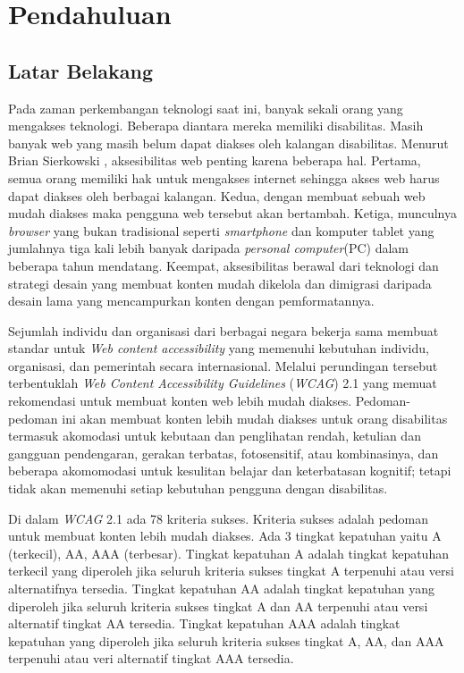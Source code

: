 \chapter{Pendahuluan}
\label{chap:intro}
   
\section{Latar Belakang}
\label{sec:label}
Pada zaman perkembangan teknologi saat ini, banyak sekali orang yang mengakses teknologi. Beberapa diantara mereka memiliki disabilitas. Masih banyak web yang masih belum dapat diakses oleh kalangan disabilitas. Menurut Brian Sierkowski \cite{brian}, aksesibilitas web penting karena beberapa hal. Pertama, semua orang memiliki hak untuk mengakses internet sehingga akses web harus dapat diakses oleh berbagai kalangan. Kedua, dengan membuat sebuah web mudah diakses maka pengguna web tersebut akan bertambah. Ketiga, munculnya \textit{browser} yang bukan tradisional seperti \textit{smartphone} dan komputer tablet yang jumlahnya tiga kali lebih banyak daripada \textit{personal computer}(PC) dalam beberapa tahun mendatang. Keempat, aksesibilitas berawal dari teknologi dan strategi desain yang membuat konten mudah dikelola dan dimigrasi daripada desain lama yang mencampurkan konten dengan pemformatannya.

Sejumlah individu dan organisasi dari berbagai negara bekerja sama membuat standar untuk \textit{Web content accessibility} yang memenuhi kebutuhan individu, organisasi, dan pemerintah secara internasional. Melalui perundingan tersebut terbentuklah \textit{Web Content Accessibility Guidelines} (\textit{WCAG}) 2.1 \cite{WCAG:2.1} yang memuat rekomendasi untuk membuat konten web lebih mudah diakses. Pedoman-pedoman ini akan membuat konten lebih mudah diakses untuk orang disabilitas termasuk akomodasi untuk kebutaan dan penglihatan rendah, ketulian dan gangguan pendengaran, gerakan terbatas, fotosensitif, atau kombinasinya, dan beberapa akomomodasi untuk kesulitan belajar dan keterbatasan kognitif; tetapi tidak akan memenuhi setiap kebutuhan pengguna dengan disabilitas. 

Di dalam \textit{WCAG} 2.1 ada 78 kriteria sukses. Kriteria sukses adalah pedoman untuk membuat konten lebih mudah diakses. Ada 3 tingkat kepatuhan yaitu A (terkecil), AA, AAA (terbesar). Tingkat kepatuhan A adalah tingkat kepatuhan terkecil yang diperoleh jika seluruh kriteria sukses tingkat A terpenuhi atau versi alternatifnya tersedia. Tingkat kepatuhan AA adalah tingkat kepatuhan yang diperoleh jika seluruh kriteria sukses tingkat A dan AA terpenuhi atau versi alternatif tingkat AA tersedia. Tingkat kepatuhan AAA adalah tingkat kepatuhan yang diperoleh jika seluruh kriteria sukses tingkat A, AA, dan AAA terpenuhi atau veri alternatif tingkat AAA tersedia.

